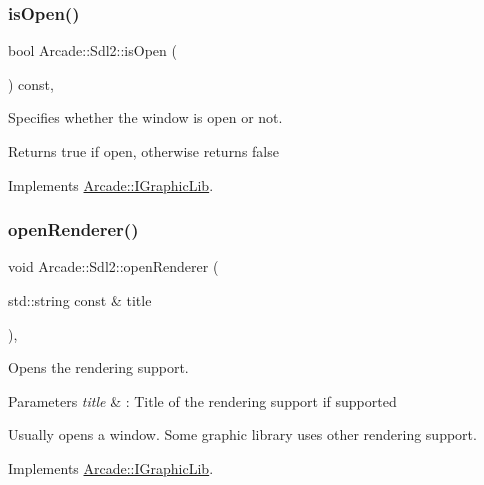 \subsubsection{\texorpdfstring{is\+Open()}{isOpen()}}
{\footnotesize\ttfamily bool Arcade\+::\+Sdl2\+::is\+Open (\begin{DoxyParamCaption}{ }\end{DoxyParamCaption}) const\hspace{0.3cm}{\ttfamily [final]}, {\ttfamily [virtual]}}



Specifies whether the window is open or not. 

\begin{DoxyReturn}{Returns}
true if open, otherwise returns false 
\end{DoxyReturn}


Implements \hyperlink{class_arcade_1_1_i_graphic_lib_adf9e107fbcfbd91e5a3daa9a2db76b4b}{Arcade\+::\+I\+Graphic\+Lib}.

\mbox{\label{class_arcade_1_1_sdl2_aa7000a687e79acf5e5ff99ae6e71194b}} 
\subsubsection{\texorpdfstring{open\+Renderer()}{openRenderer()}}
{\footnotesize\ttfamily void Arcade\+::\+Sdl2\+::open\+Renderer (\begin{DoxyParamCaption}\item[{std\+::string const \&}]{title }\end{DoxyParamCaption})\hspace{0.3cm}{\ttfamily [final]}, {\ttfamily [virtual]}}



Opens the rendering support. 


\begin{DoxyParams}{Parameters}
{\em title} & \+: Title of the rendering support if supported\\
\hline
\end{DoxyParams}
Usually opens a window. Some graphic library uses other rendering support. 

Implements \hyperlink{class_arcade_1_1_i_graphic_lib_a71f7f51bdd61b02377c4a9ec330eabb1}{Arcade\+::\+I\+Graphic\+Lib}.

